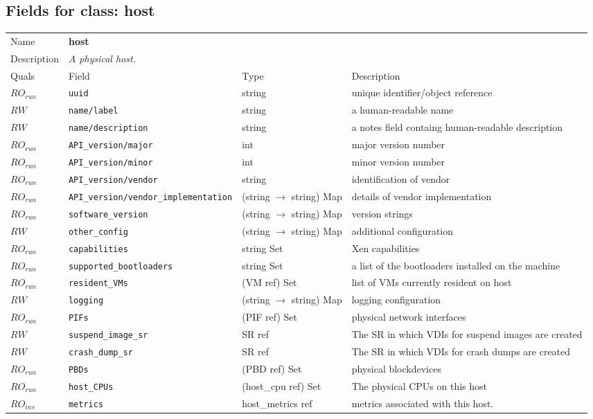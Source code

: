 \subsection{Fields for class: host}
\begin{longtable}{|lllp{}|}
\hline
\multicolumn{1}{|l}{Name} & \multicolumn{3}{l|}{\bf host} \\
\multicolumn{1}{|l}{Description} & \multicolumn{3}{l|}{\parbox{11cm}{\em A
physical host.}} \\
\hline
Quals & Field & Type & Description \\
\hline
$\mathit{RO}_\mathit{run}$ &  {\tt uuid} & string & unique identifier/object reference \\
$\mathit{RW}$ &  {\tt name/label} & string & a human-readable name \\
$\mathit{RW}$ &  {\tt name/description} & string & a notes field containg human-readable description \\
$\mathit{RO}_\mathit{run}$ &  {\tt API\_version/major} & int & major version number \\
$\mathit{RO}_\mathit{run}$ &  {\tt API\_version/minor} & int & minor version number \\
$\mathit{RO}_\mathit{run}$ &  {\tt API\_version/vendor} & string & identification of vendor \\
$\mathit{RO}_\mathit{run}$ &  {\tt API\_version/vendor\_implementation} & (string $\rightarrow$ string) Map & details of vendor implementation \\
$\mathit{RO}_\mathit{run}$ &  {\tt software\_version} & (string $\rightarrow$ string) Map & version strings \\
$\mathit{RW}$ &  {\tt other\_config} & (string $\rightarrow$ string) Map & additional configuration \\
$\mathit{RO}_\mathit{run}$ &  {\tt capabilities} & string Set & Xen capabilities \\
$\mathit{RO}_\mathit{run}$ &  {\tt supported\_bootloaders} & string Set & a list of the bootloaders installed on the machine \\
$\mathit{RO}_\mathit{run}$ &  {\tt resident\_VMs} & (VM ref) Set & list of VMs currently resident on host \\
$\mathit{RW}$ &  {\tt logging} & (string $\rightarrow$ string) Map & logging configuration \\
$\mathit{RO}_\mathit{run}$ &  {\tt PIFs} & (PIF ref) Set & physical network interfaces \\
$\mathit{RW}$ &  {\tt suspend\_image\_sr} & SR ref & The SR in which VDIs for suspend images are created \\
$\mathit{RW}$ &  {\tt crash\_dump\_sr} & SR ref & The SR in which VDIs for crash dumps are created \\
$\mathit{RO}_\mathit{run}$ &  {\tt PBDs} & (PBD ref) Set & physical blockdevices \\
$\mathit{RO}_\mathit{run}$ &  {\tt host\_CPUs} & (host\_cpu ref) Set & The physical CPUs on this host \\
$\mathit{RO}_\mathit{ins}$ &  {\tt metrics} & host\_metrics ref & metrics associated with this host. \\
\hline
\end{longtable}
